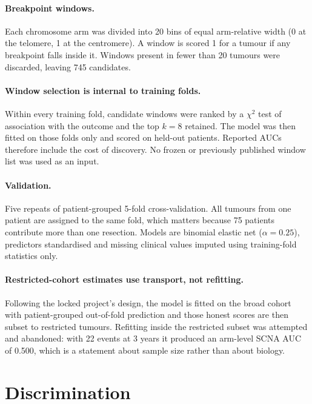 \documentclass[11pt]{article}
\begin{document}
\paragraph{Breakpoint windows.}
Each chromosome arm was divided into 20 bins of equal arm-relative width
(0 at the telomere, 1 at the centromere). A window is scored 1 for a tumour if
any breakpoint falls inside it. Windows present in fewer than 20 tumours were
discarded, leaving 745 candidates.

\paragraph{Window selection is internal to training folds.}
Within every training fold, candidate windows were ranked by a
$\chi^2$ test of association with the outcome and the top $k=8$ retained. The
model was then fitted on those folds only and scored on held-out patients.
Reported AUCs therefore include the cost of discovery. No frozen or previously
published window list was used as an input.

\paragraph{Validation.}
Five repeats of patient-grouped 5-fold cross-validation. All tumours from one
patient are assigned to the same fold, which matters because 75 patients
contribute more than one resection. Models are binomial elastic net
($\alpha=0.25$), predictors standardised and missing clinical values imputed
using training-fold statistics only.

\paragraph{Restricted-cohort estimates use transport, not refitting.}
Following the locked project's design, the model is fitted on the broad cohort
with patient-grouped out-of-fold prediction and those honest scores are then
subset to restricted tumours. Refitting inside the restricted subset was
attempted and abandoned: with 22 events at 3 years it produced an arm-level SCNA
AUC of 0.500, which is a statement about sample size rather than about biology.

\section{Discrimination}
\end{document}
